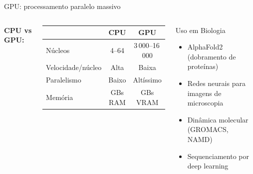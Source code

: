 \begin{frame}[shrink=5]{GPU: processamento paralelo massivo}

\vspace{0.6cm}

\begin{columns}
\textbf{CPU vs GPU:}
\begin{center}
\begin{tabular}{lcc}
\toprule
& \textbf{CPU} & \textbf{GPU} \\
\midrule
Núcleos & 4--64 & 3\,000--16\,000 \\
Velocidade/núcleo & Alta & Baixa \\
Paralelismo & Baixo & Altíssimo \\
Memória & GBs RAM & GBs VRAM \\
\bottomrule
\end{tabular}
\end{center}

\begin{exampleblock}{Uso em Biologia}
\begin{itemize}
    \item AlphaFold2 (dobramento de proteínas)
    \item Redes neurais para imagens de microscopia
    \item Dinâmica molecular (GROMACS, NAMD)
    \item Sequenciamento por deep learning
\end{itemize}
\end{exampleblock}
\end{columns}
\end{frame}


